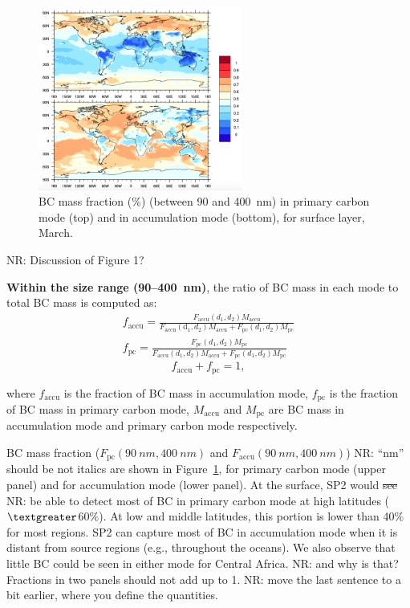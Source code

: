 \documentclass[11pt]{article}
\newcommand{\nrtodo}[1]{{\color{blue} NR: #1}}
\begin{document}
\begin{figure}[!h] 
	\begin{center}
		\includegraphics[width = 0.6\textwidth]{Rplot02}
		\caption[]{\label{fig_P2} BC mass fraction ($\%$) (between 90 and 400~nm) in primary carbon mode (top) and in accumulation mode (bottom), for surface layer, March.}
	\end{center}
\end{figure}

\nrtodo{Discussion of Figure 1?}

\noindent \textbf{Within the size range (90--400~nm)}, the ratio of BC mass in each mode to total BC mass is computed as:
\begin{align*}
f_{\text{accu}} = \frac{F_{\text{accu}}(d_{1}, d_{2})M_{\text{accu}}}{F_{\text{accu}}(\text{d}_{1}, d_{2})M_{\text{accu}}+F_{\text{pc}}(d_{1}, d_{2})M_{\text{pc}}}\\
f_{\text{pc}} = \frac{F_{\text{pc}}(d_{1}, d_{2})M_{\text{pc}}}{F_{\text{accu}}(d_{1}, d_{2})M_{\text{accu}}+F_{\text{pc}}(d_{1}, d_{2})M_{\text{pc}}}
\end{align*}
\[f_{\text{accu}} + f_{\text{pc}} = 1,\]

\noindent where $f_{\text{accu}}$ is the fraction of BC mass in
accumulation mode, $f_{\text{pc}}$ is the fraction of BC mass in
primary carbon mode, $M_{\text{accu}}$ and $M_{\text{pc}}$ are BC mass
in accumulation mode and primary carbon mode respectively.

\noindent BC mass fraction ($F_{\text{pc}}(90~nm, 400~nm)$ and
$F_{\text{accu}}(90~nm, 400~nm)$) \nrtodo{``nm'' should be not
  italics} are shown in Figure~\ref{fig_P2}, for primary carbon mode
(upper panel) and for accumulation mode (lower panel). At the surface,
SP2 would \sout{see} \nrtodo{be able to detect} most of BC in primary
carbon mode at high latitudes ($\textgreater$60$\%$).  At low and
middle latitudes, this portion is lower than 40$\%$ for most
regions. SP2 can capture most of BC in accumulation mode when it is
distant from source regions (e.g., throughout the oceans). We also
observe that little BC could be seen in either mode for Central
Africa. \nrtodo{and why is that?} Fractions in two panels should not
add up to 1. \nrtodo{move the last sentence to a bit earlier, where
  you define the quantities.}
\end{document}
